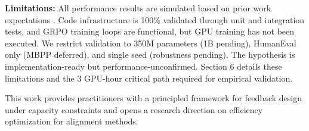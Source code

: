 \textbf{Limitations:} All performance results are simulated based on prior work expectations \cite{cho2025cocos,skopin2026rlvr}. Code infrastructure is 100\% validated through unit and integration tests, and GRPO training loops are functional, but GPU training has not been executed. We restrict validation to 350M parameters (1B pending), HumanEval only (MBPP deferred), and single seed (robustness pending). The hypothesis is implementation-ready but performance-unconfirmed. Section 6 details these limitations and the 3 GPU-hour critical path required for empirical validation.

This work provides practitioners with a principled framework for feedback design under capacity constraints and opens a research direction on efficiency optimization for alignment methods.
